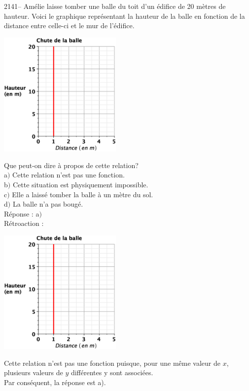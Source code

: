 \documentclass[letterpaper, 12pt]{article}
\begin{document}
2141-- Am\'elie laisse tomber une balle du toit d'un \'edifice de 20 m\`etres de hauteur. Voici le graphique repr\'esentant la hauteur de la balle en fonction de la distance entre celle-ci et le mur de l'\'edifice. \\
\begin{center}
 \includegraphics[width=6cm,bb=20 118 575 673]{Q2141.eps}
\end{center}
Que peut-on dire \`a propos de cette relation?\\

a$)$ Cette relation n'est pas une fonction.\\
b$)$ Cette situation est physiquement impossible.\\
c$)$ Elle a laiss\'e tomber la balle \`a un m\`etre du sol.\\
d$)$ La balle n'a pas boug\'e.\\

R\'eponse : a$)$\\

R\'etroaction :\\
\begin{center}
 \includegraphics[width=6cm,bb=20 118 575 673]{Q2141.eps}
\end{center}
Cette relation n'est pas une fonction puisque, pour une m\^eme valeur de $x$, plusieurs valeurs de $y$ diff\'erentes y sont associ\'ees.\\
Par cons\'equent, la r\'eponse est a).\\
\end{document}
